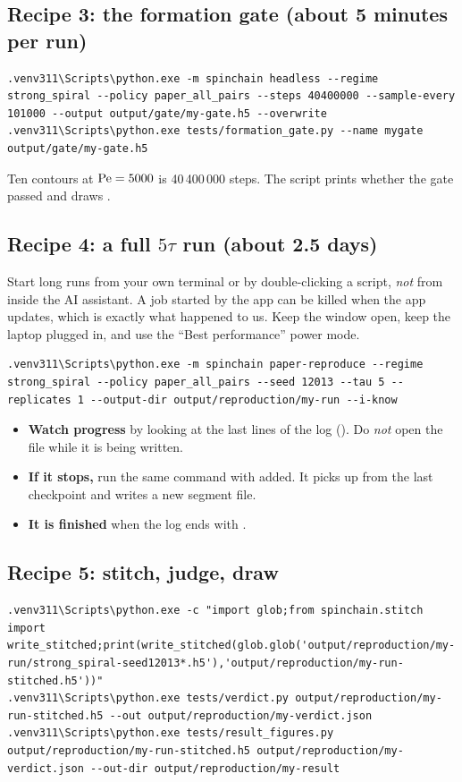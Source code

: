 \subsection{Recipe 3: the formation gate (about 5 minutes per run)}
\begin{lstlisting}[style=sh]
.venv311\Scripts\python.exe -m spinchain headless --regime strong_spiral --policy paper_all_pairs --steps 40400000 --sample-every 101000 --output output/gate/my-gate.h5 --overwrite
.venv311\Scripts\python.exe tests/formation_gate.py --name mygate output/gate/my-gate.h5
\end{lstlisting}
Ten contours at $\mathrm{Pe}=5000$ is 40\,400\,000 steps. The script prints whether the gate passed and draws .

\subsection{Recipe 4: a full $5\tau$ run (about 2.5 days)}
\begin{warnbox}[title=Start long runs yourself]
Start long runs from your own terminal or by double-clicking a script, \emph{not} from inside the AI assistant. A job started by the app can be killed when the app updates, which is exactly what happened to us. Keep the window open, keep the laptop plugged in, and use the ``Best performance'' power mode.
\end{warnbox}
\begin{lstlisting}[style=sh]
.venv311\Scripts\python.exe -m spinchain paper-reproduce --regime strong_spiral --policy paper_all_pairs --seed 12013 --tau 5 --replicates 1 --output-dir output/reproduction/my-run --i-know
\end{lstlisting}
\begin{itemize}
\item \textbf{Watch progress} by looking at the last lines of the log (). Do \emph{not} open the  file while it is being written.
\item \textbf{If it stops,} run the same command with  added. It picks up from the last checkpoint and writes a new segment file.
\item \textbf{It is finished} when the log ends with .
\end{itemize}

\subsection{Recipe 5: stitch, judge, draw}
\begin{lstlisting}[style=sh]
.venv311\Scripts\python.exe -c "import glob;from spinchain.stitch import write_stitched;print(write_stitched(glob.glob('output/reproduction/my-run/strong_spiral-seed12013*.h5'),'output/reproduction/my-run-stitched.h5'))"
.venv311\Scripts\python.exe tests/verdict.py output/reproduction/my-run-stitched.h5 --out output/reproduction/my-verdict.json
.venv311\Scripts\python.exe tests/result_figures.py output/reproduction/my-run-stitched.h5 output/reproduction/my-verdict.json --out-dir output/reproduction/my-result
\end{lstlisting}

